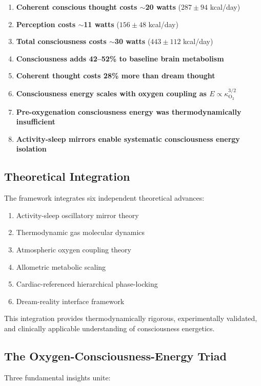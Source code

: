 \documentclass[12pt]{article}
\theoremstyle{remark}
\begin{document}
\begin{enumerate}
\item \textbf{Coherent conscious thought costs $\sim$20 watts} ($287 \pm 94$ kcal/day)
\item \textbf{Perception costs $\sim$11 watts} ($156 \pm 48$ kcal/day)
\item \textbf{Total consciousness costs $\sim$30 watts} ($443 \pm 112$ kcal/day)
\item \textbf{Consciousness adds 42--52\% to baseline brain metabolism}
\item \textbf{Coherent thought costs 28\% more than dream thought}
\item \textbf{Consciousness energy scales with oxygen coupling as $E \propto \kappa_{\text{O}_2}^{3/2}$}
\item \textbf{Pre-oxygenation consciousness energy was thermodynamically insufficient}
\item \textbf{Activity-sleep mirrors enable systematic consciousness energy isolation}
\end{enumerate}

\subsection{Theoretical Integration}

The framework integrates six independent theoretical advances:
\begin{enumerate}
\item Activity-sleep oscillatory mirror theory
\item Thermodynamic gas molecular dynamics
\item Atmospheric oxygen coupling theory
\item Allometric metabolic scaling
\item Cardiac-referenced hierarchical phase-locking
\item Dream-reality interface framework
\end{enumerate}

This integration provides thermodynamically rigorous, experimentally validated, and clinically applicable understanding of consciousness energetics.

\subsection{The Oxygen-Consciousness-Energy Triad}

Three fundamental insights unite:
\end{document}

